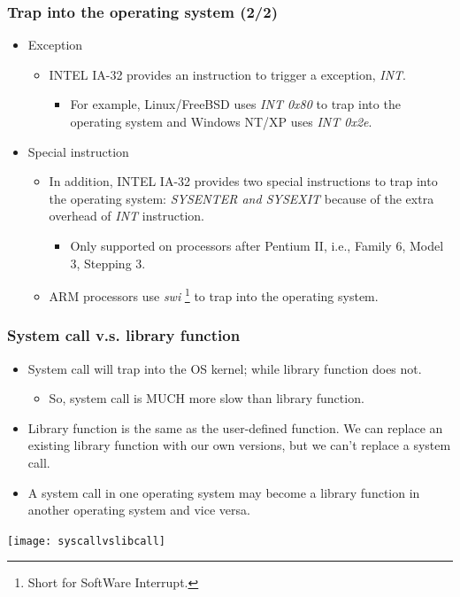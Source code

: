 \documentclass[CJKutf8,xcolor=pdftex,dvipsnames,table]{beamer}
\begin{document}
\begin{CJK*}{UTF8}{song}
  \begin{frame}
    \frametitle{Trap into the operating system (2/2)} \pause
    \begin{itemize}
    \item{Exception} \pause
      \begin{itemize}
      \item{INTEL IA-32 provides an instruction to trigger a exception, \emph{INT}.} \pause
        \begin{itemize}
        \item{For example, Linux/FreeBSD uses \emph{INT 0x80} to trap into the operating system and Windows NT/XP uses \emph{INT 0x2e}.} \pause
        \end{itemize}
      \end{itemize}
    \item{Special instruction} \pause
      \begin{itemize}
      \item{In addition, INTEL IA-32 provides two special instructions to trap into the operating system: \emph{SYSENTER and SYSEXIT} because of the extra overhead of \emph{INT} instruction.} \pause
        \begin{itemize}
        \item{Only supported on processors after Pentium II, i.e., Family 6, Model 3, Stepping 3.} \pause
        \end{itemize}
      \item{ARM processors use \emph{swi} \footnote{Short for SoftWare
        Interrupt.} to trap into the operating system.}
      \end{itemize}
    \end{itemize}
  \end{frame}

  \begin{frame}
    \frametitle{System call v.s. library function} \pause
    \begin{itemize}
    \item{System call will trap into the OS kernel; while library function does not.} \pause
      \begin{itemize}
      \item{So, system call is MUCH more slow than library function.} \pause
      \end{itemize}
    \item{Library function is the same as the user-defined function. We can replace an existing library function with our own versions, but we can't replace a system call.} \pause
    \item{A system call in one operating system may become a library function in another operating system and vice versa.} \pause
    \end{itemize}
    \begin{center}
      \texttt{[image: syscallvslibcall]}
    \end{center}
  \end{frame}


\end{CJK*}
\end{document}
